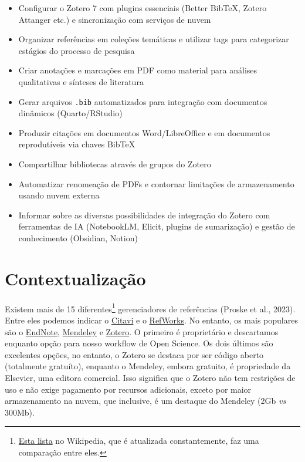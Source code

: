 \documentclass[
  a4paper,
]{book}
\providecommand{\tightlist}{%
  \setlength{\itemsep}{0pt}\setlength{\parskip}{0pt}}\usepackage{longtable,booktabs,array}
\newcommand{\emojitext}[1]{{\emoji #1}}
\begin{document}
\begin{tcolorbox}[enhanced jigsaw, colback=white, toptitle=1mm, opacityback=0, left=2mm, rightrule=.15mm, title={\emojitext{🎯} Ao final deste módulo, você será capaz de:}, coltitle=black, opacitybacktitle=0.6, breakable, toprule=.15mm, bottomtitle=1mm, titlerule=0mm, bottomrule=.15mm, arc=.35mm, leftrule=.75mm, colframe=quarto-callout-tip-color-frame, colbacktitle=quarto-callout-tip-color!10!white]

\begin{itemize}
\tightlist
\item
  Configurar o Zotero 7 com plugins essenciais (Better BibTeX, Zotero
  Attanger etc.) e sincronização com serviços de nuvem
\item
  Organizar referências em coleções temáticas e utilizar tags para
  categorizar estágios do processo de pesquisa
\item
  Criar anotações e marcações em PDF como material para análises
  qualitativas e sínteses de literatura
\item
  Gerar arquivos \texttt{.bib} automatizados para integração com
  documentos dinâmicos (Quarto/RStudio)
\item
  Produzir citações em documentos Word/LibreOffice e em documentos
  reprodutíveis via chaves BibTeX
\item
  Compartilhar bibliotecas através de grupos do Zotero
\item
  Automatizar renomeação de PDFs e contornar limitações de armazenamento
  usando nuvem externa
\item
  Informar sobre as diversas possibilidades de integração do Zotero com
  ferramentas de IA (NotebookLM, Elicit, plugins de sumarização) e
  gestão de conhecimento (Obsidian, Notion)
\end{itemize}

\end{tcolorbox}

\section{Contextualização}\label{contextualizauxe7uxe3o-2}

Existem mais de 15 diferentes\footnote{\href{https://en.wikipedia.org/wiki/Comparison_of_reference_management_software}{Esta
  lista} no Wikipedia, que é atualizada constantemente, faz uma
  comparação entre eles.} gerenciadores de referências (Proske et al.,
2023). Entre eles podemos indicar o
\href{https://www.citavi.com/en}{Citavi} e o
\href{https://refworks.proquest.com/learn-more/}{RefWorks}. No entanto,
os mais populares são o \href{https://endnote.com/}{EndNote},
\href{https://www.mendeley.com/reference-management/reference-manager/}{Mendeley}
e \href{https://www.zotero.org/}{Zotero}. O primeiro é proprietário e
descartamos enquanto opção para nosso workflow de Open Science. Os dois
últimos são excelentes opções, no entanto, o Zotero se destaca por ser
código aberto (totalmente gratuíto), enquanto o Mendeley, embora
gratuito, é propriedade da Elsevier, uma editora comercial. Isso
significa que o Zotero não tem restrições de uso e não exige pagamento
por recursos adicionais, exceto por maior armazenamento na nuvem, que
inclusive, é um destaque do Mendeley (2Gb \emph{vs} 300Mb).
\end{document}
